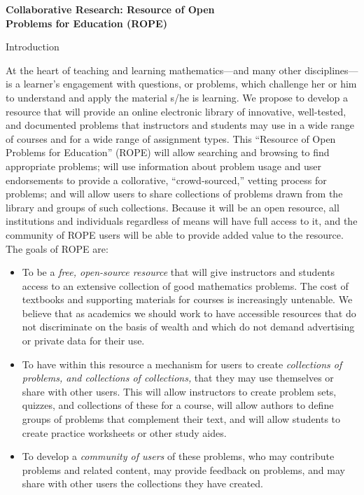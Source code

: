 \documentclass[11pt]{article}
\begin{document}
\begin{center}
{\Large \textbf{Collaborative Research: Resource of Open\\
Problems for Education (ROPE)}}
\end{center}

\begin{section}{Introduction}

At the heart of teaching and learning mathematics---and many other
disciplines---is a learner's engagement with questions, or problems, which
challenge her or him to understand and apply the material s/he is
learning.  We propose to develop a resource that will provide an online
electronic library of innovative, well-tested, and documented problems
that instructors and students may use in a wide range of courses and for a
wide range of assignment types.  This ``Resource of Open Problems for
Education'' (ROPE) will allow searching and browsing to find appropriate
problems; will use information about problem usage and user endorsements
to provide a collorative, ``crowd-sourced,'' vetting process for problems;
and will allow users to share collections of problems drawn from the
library and groups of such collections.  Because it will be an open
resource, all institutions and individuals regardless of means will have
full access to it, and the community of ROPE users will be able to provide
added value to the resource.  The goals of ROPE are:
\begin{itemize}
  \item
    To be a \textit{free, open-source resource} that will give instructors
    and students access to an extensive collection of good mathematics
    problems.  The cost of textbooks and supporting materials for courses
    is increasingly untenable.  We believe that as academics
    we should work to have accessible resources that do not
    discriminate on the basis of wealth and which do not demand
    advertising or private data for their use.
  \item
    To have within this resource a mechanism for users to create
    \textit{collections of problems, and collections of collections,} that
    they may use themselves or share with other users.  This will allow
    instructors to create problem sets, quizzes, and collections of these
    for a course, will allow authors to define groups of problems that
    complement their text, and will allow students to create practice
    worksheets or other study aides.
  \item
    To develop a \textit{community of users} of these problems, who may
    contribute problems and related content, may provide feedback on
    problems, and may share with other users the collections they have
    created.
\end{itemize}

\end{section}
\end{document}
